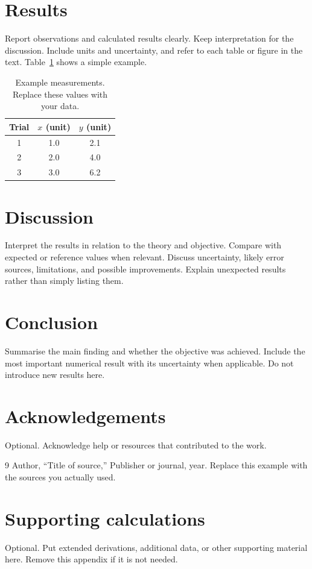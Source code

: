 \documentclass[5p,a4paper]{elsarticle}
\begin{document}
	\section{Results}
	Report observations and calculated results clearly. Keep interpretation for
	the discussion. Include units and uncertainty, and refer to each table or
	figure in the text. Table~\ref{tab:example} shows a simple example.
	
	\begin{table}[H]
		\centering
		\caption{Example measurements. Replace these values with your data.}
		\label{tab:example}
		\begin{tabular}{ccc}
			\toprule
			Trial & $x$ (unit) & $y$ (unit) \\
			\midrule
			1 & 1.0 & 2.1 \\
			2 & 2.0 & 4.0 \\
			3 & 3.0 & 6.2 \\
			\bottomrule
		\end{tabular}
	\end{table}
	
	\section{Discussion}
	Interpret the results in relation to the theory and objective. Compare with
	expected or reference values when relevant. Discuss uncertainty, likely error
	sources, limitations, and possible improvements. Explain unexpected results
	rather than simply listing them.
	
	\section{Conclusion}
	Summarise the main finding and whether the objective was achieved. Include the
	most important numerical result with its uncertainty when applicable. Do not
	introduce new results here.
	
	\section*{Acknowledgements}
	Optional. Acknowledge help or resources that contributed to the work.
	
	\begin{thebibliography}{9}
		Author, ``Title of source,'' Publisher or journal, year. Replace this example
		with the sources you actually used.
	\end{thebibliography}
	
	\appendix
	\section{Supporting calculations}
	Optional. Put extended derivations, additional data, or other supporting
	material here. Remove this appendix if it is not needed.
	
\end{document}
